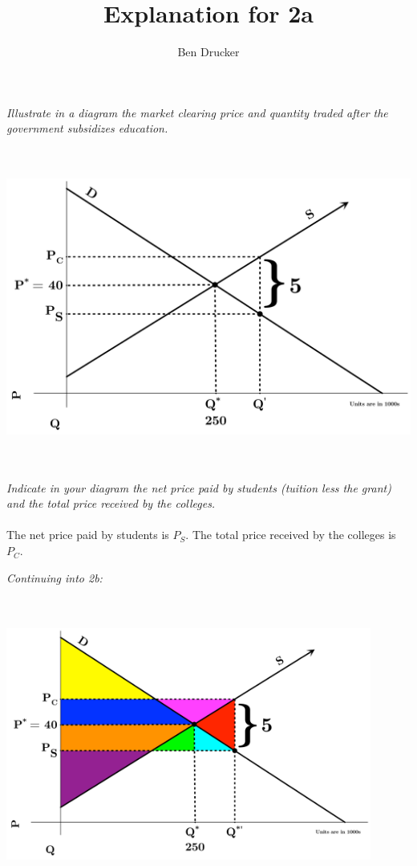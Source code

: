 \documentclass[]{article}
\begin{document}
\title{Explanation for 2a}
\author{Ben Drucker}
\date{}

\textit{Illustrate in a diagram the market clearing price and quantity traded after the government subsidizes education.}\\\\

\includegraphics[height=4in]{Charts/2a} \\\\

\textit{Indicate in your diagram the net price paid by students (tuition less the grant) and the total price received by the colleges.}\\\\

The net price paid by students is $P_S$. The total price received by the colleges is  $P_C$. 

\newpage

\textit{Continuing into 2b:}\\\\\

\includegraphics[height=3in]{Charts/2a-color}
\end{document}

